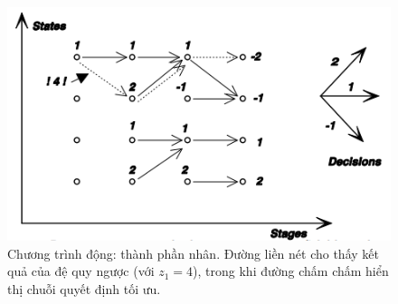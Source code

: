 \documentclass[12pt,a4paper]{report}
\begin{document}
\begin{itemize}
		\begin{figure}[h]
			\centering
			\includegraphics[scale=.9]{hinh3.png}
			\caption{Chương trình động: thành phần nhân. Đường liền nét cho thấy
				kết quả của đệ quy ngược (với $z_1 = 4$), trong khi đường chấm chấm hiển thị chuỗi quyết định tối ưu.}
		\end{figure} 
		\end{itemize}	
		
\end{document}
